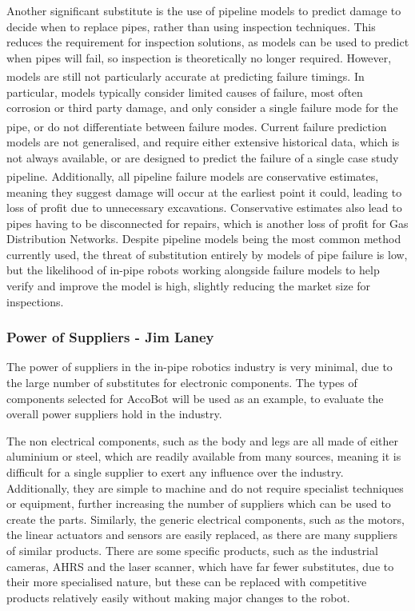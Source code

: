 \documentclass[11pt]{article}		%
\newcommand{\supercite}[1]{\textsuperscript{\cite{#1}}}		%
\begin{document}
				Another significant substitute is the use of pipeline models to predict damage to decide when to replace pipes, rather than using inspection techniques.
				This reduces the requirement for inspection solutions, as models can be used to predict when pipes will fail, so inspection is theoretically no longer required.
				However, models are still not particularly accurate at predicting failure timings\supercite{zakikhani2020review}.
				In particular, models typically consider limited causes of failure, most often corrosion or third party damage, and only consider a single failure mode for the pipe, or  do not differentiate between failure modes\supercite{zakikhani2020review}.
				Current failure prediction models are not generalised, and require either extensive historical data, which is not always available, or are designed to predict the failure of a single case study pipeline\supercite{zakikhani2020review}.
				Additionally, all pipeline failure models are conservative estimates, meaning they suggest damage will occur at the earliest point it could, leading to loss of profit due to unnecessary excavations.
				Conservative estimates also lead to pipes having to be disconnected for repairs, which is another loss of profit for Gas Distribution Networks.
				Despite pipeline models being the most common method currently used, the threat of substitution entirely by models of pipe failure is low, but the likelihood of in-pipe robots working alongside failure models to help verify and improve the model is high, slightly reducing the market size for inspections. 
				
			\subsubsection{Power of Suppliers - Jim Laney}
				
				The power of suppliers in the in-pipe robotics industry is very minimal, due to the large number of substitutes for electronic components.
				The types of components selected for AccoBot will be used as an example, to evaluate the overall power suppliers hold in the industry.
				
				The non electrical components, such as the body and legs are all made of either aluminium or steel, which are readily available from many sources, meaning it is difficult for a single supplier to exert any influence over the industry.
				Additionally, they are simple to machine and do not require specialist techniques or equipment, further increasing the number of suppliers which can be used to create the parts.
				Similarly, the generic electrical components, such as the motors, the linear actuators and sensors are easily replaced, as there are many suppliers of similar products.
				There are some specific products, such as the industrial cameras, AHRS and the laser scanner, which have far fewer substitutes, due to their more specialised nature, but these can be replaced with competitive products relatively easily without making major changes to the robot.
				
\end{document}
